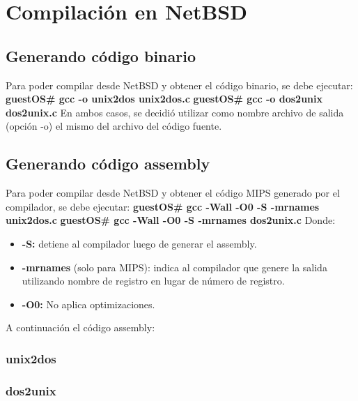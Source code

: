 \documentclass[a4paper,10pt]{article}
\begin{document}
\section{Compilaci\'on en NetBSD}
  \subsection{Generando c\'odigo binario}
    Para poder compilar desde NetBSD y obtener el c\'odigo binario, se debe ejecutar:
    \newline
    {\bf guestOS\# gcc -o unix2dos unix2dos.c} \newline
    {\bf guestOS\# gcc -o dos2unix dos2unix.c}
    \newline
    En ambos casos, se decidi\'o utilizar como nombre archivo de salida (opci\'on -o) el mismo del archivo 
    del c\'odigo fuente.
    
  \subsection{Generando c\'odigo assembly}
    Para poder compilar desde NetBSD y obtener el c\'odigo MIPS generado por el compilador, se debe ejecutar:
    \newline
    {\bf guestOS\# gcc -Wall -O0 -S -mrnames unix2dos.c} 
    \newline
    {\bf guestOS\# gcc -Wall -O0 -S -mrnames dos2unix.c}
    \newline
    Donde:
    \begin{itemize}
      \item {\bf-S:} detiene al compilador luego de generar el assembly.
      \item {\bf-mrnames} (solo para MIPS): indica al compilador que genere la salida utilizando nombre de 
	registro en lugar de n\'umero de registro.
      \item {\bf-O0:} No aplica optimizaciones.
    \end{itemize}
    A continuaci\'on el c\'odigo assembly:
    \subsubsection{unix2dos}
      \lstset{numbers=left, frame=single, breaklines=true}
      
    \subsubsection{dos2unix}
      \lstset{numbers=left, frame=single, breaklines=true}
      
\end{document}
